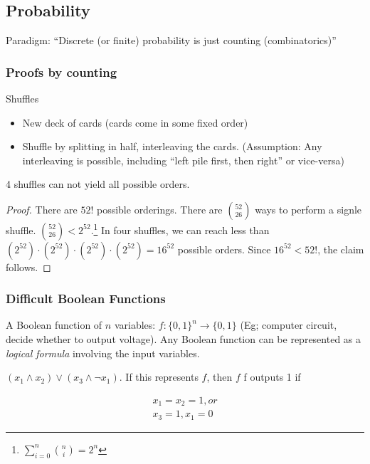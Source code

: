 \documentclass{article}
\begin{document}
\subsection*{Probability}

Paradigm: ``Discrete (or finite) probability is just counting (combinatorics)''

\subsubsection*{Proofs by counting}

Shuffles
\begin{itemize}
\item New deck of cards (cards come in some fixed order)
\item Shuffle by splitting in half, interleaving the cards. (Assumption: Any interleaving is possible, including ``left pile first, then right'' or vice-versa)
\end{itemize}

\begin{clm}
4 shuffles can not yield all possible orders.
\end{clm}

\begin{proof}
There are $52!$ possible orderings.  There are ${52 \choose 26}$ ways to perform a signle shuffle.  ${ 52 \choose 26} < 2^{52}$.\footnote{$\displaystyle \sum_{i=0}^n {n \choose i} = 2^n$}  In four shuffles, we can reach less than $(2^52) \cdot (2^52) \cdot (2^52) \cdot (2^52) = 16^52$ possible orders.  Since $16^52 < 52!$, the claim follows.
\end{proof}

\subsubsection*{Difficult Boolean Functions}

A Boolean function of $n$ variables: $f: \{0,1\}^n \rightarrow \{0,1\}$ (Eg; computer circuit, decide whether to output voltage).   Any Boolean function can be represented as a \emph{logical formula} involving the input variables.

\begin{examp}
$(x_1 \land x_2) \lor (x_3 \land  \neg x_1)$.  If this represents $f$, then $f$ f outputs 1 if 

\[\begin{array}{ll}
x_1 = x_2 =1, or \\
x_3 =1, x_1 = 0 
\end{array}
\]

\end{examp}
\end{document}
